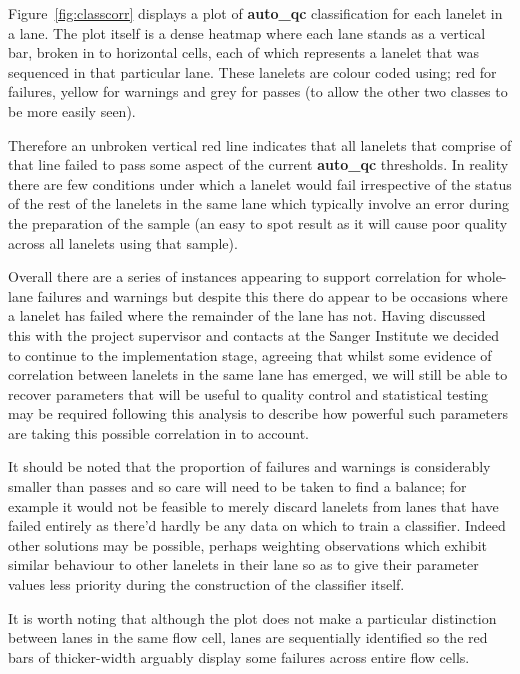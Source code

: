 Figure~\ref{fig:classcorr} displays a plot of \textbf{auto\_qc} classification
for each lanelet in a lane. The plot itself is a dense heatmap
where each lane stands as a vertical bar, broken in to horizontal cells, each
of which represents a lanelet that was sequenced in that particular lane. These
lanelets are colour coded using; red for failures, yellow for warnings and grey
for passes (to allow the other two classes to be more easily seen).

Therefore an unbroken vertical red line indicates that all lanelets that
comprise of that line failed to pass some aspect of the current
\textbf{auto\_qc} thresholds. In reality there are few conditions under which
a lanelet would fail irrespective of the status of the rest of the lanelets in
the same lane which typically involve an error during the preparation of the
sample (an easy to spot result as it will cause poor quality across all lanelets
using that sample).

Overall there are a series of instances appearing to support correlation for
whole-lane failures and warnings but despite this there do appear to be occasions
where a lanelet has failed where the remainder of the lane has not.
Having discussed this with the project supervisor and contacts at the Sanger Institute we decided to continue to
the implementation stage, agreeing that whilst some evidence of correlation
between lanelets in the same lane has emerged, we will still be able to recover
parameters that will be useful to quality control and statistical testing may be
required following this analysis to describe how powerful such parameters are
taking this possible correlation in to account.

It should be
noted that the proportion of failures and warnings is considerably smaller than
passes and so care will need to be taken to find a balance; for example it would
not be feasible to merely discard lanelets from lanes that have failed entirely
as there'd hardly be any data on which to train a classifier. Indeed other
solutions may be possible, perhaps weighting observations which exhibit similar
behaviour to other lanelets in their lane so as to give their parameter values
less priority during the construction of the classifier itself.

It is worth noting that although the plot does not make a particular
distinction between lanes in the same flow cell, lanes are sequentially
identified so the red bars of thicker-width arguably display some failures
across entire flow cells.


